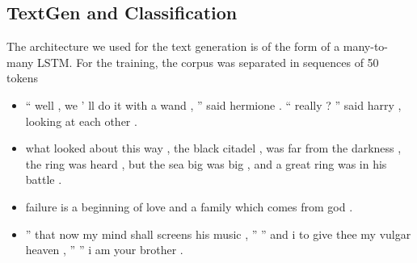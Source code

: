 \documentclass[landscape,a0paper,fontscale=0.285]{baposter} %
\newcommand{\compresslist}{ 
  \setlength{\itemsep}{1pt}
  \setlength{\parskip}{0pt}
  \setlength{\parsep}{0pt}}
\begin{document}
\begin{poster}
{\begin{multicols}{2}
\begin{center}
\subsection*{TextGen and Classification}
\end{center}
The architecture we used for the text generation is of the form of a many-to-many LSTM. For the training, the corpus was separated in sequences of 50 tokens
\begin{itemize}\compresslist
    \item `` well , we ' ll do it with a wand , '' said hermione . `` really ? '' said harry , looking at each other .
    \item  what looked about this way , the black citadel , was far from the darkness , the ring was heard , but the sea big was big , and a great ring was in his battle .
    \item failure is a beginning of love and a family which comes from god .
    \item  '' that now my mind shall screens his music , '' '' and i to give thee my vulgar heaven , '' '' i am your brother .
\end{itemize}
\end{multicols} }

\vspace{-1 cm}



\end{poster}
\end{document}
